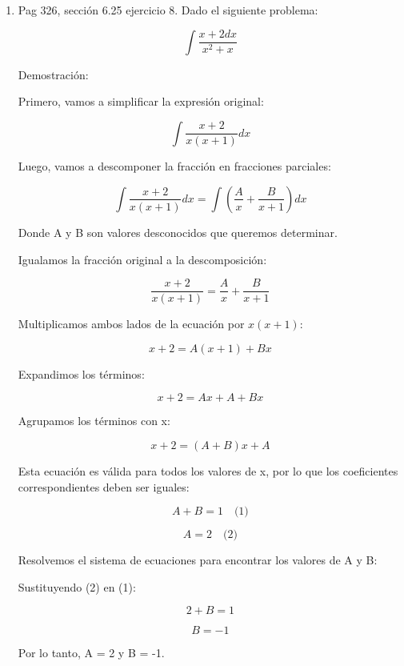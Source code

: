\documentclass{report}
\begin{document}
\begin{enumerate}
        \item Pag 326, sección 6.25 ejercicio 8. Dado el siguiente problema:
        
        \[
        \int \frac{x+2dx}{x^2+x}
        \]
        
        Demostración:
        
        Primero, vamos a simplificar la expresión original:
        
        \[
        \int \frac{x+2}{x(x+1)}dx
        \]
        
        Luego, vamos a descomponer la fracción en fracciones parciales:
        
        \[
        \int \frac{x+2}{x(x+1)}dx = \int \left(\frac{A}{x} + \frac{B}{x+1}\right)dx
        \]
        
        Donde A y B son valores desconocidos que queremos determinar.
        
        Igualamos la fracción original a la descomposición:
        
        \[
        \frac{x+2}{x(x+1)} = \frac{A}{x} + \frac{B}{x+1}
        \]
        
        Multiplicamos ambos lados de la ecuación por $x(x+1)$:
        
        \[
        x+2 = A(x+1) + Bx
        \]
        
        Expandimos los términos:
        
        \[
        x+2 = Ax + A + Bx
        \]
        
        Agrupamos los términos con x:
        
        \[
        x+2 = (A+B)x + A
        \]
        
        Esta ecuación es válida para todos los valores de x, por lo que los coeficientes correspondientes deben ser iguales:
        
        \[
        A+B = 1 \quad \text{(1)}
        \]
        
        \[
        A = 2 \quad \text{(2)}
        \]
        
        Resolvemos el sistema de ecuaciones para encontrar los valores de A y B:
        
        Sustituyendo (2) en (1):
        
        \[
        2 + B = 1
        \]
        
        \[
        B = -1
        \]
        
        Por lo tanto, A = 2 y B = -1.
        

\end{enumerate}
\end{document}
